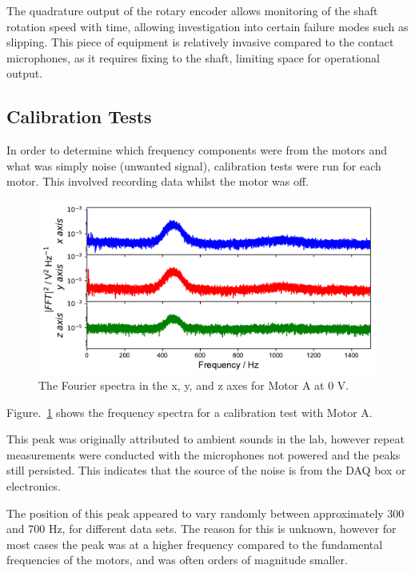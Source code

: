 The quadrature output of the rotary encoder allows monitoring of the shaft rotation speed with time, allowing investigation into certain failure modes such as slipping. This piece of equipment is relatively invasive compared to the contact microphones, as it requires fixing to the shaft, limiting space for operational output. 

\subsection{Calibration Tests}

In order to determine which frequency components were from the motors and what was simply noise (unwanted signal), calibration tests were run for each motor. This involved recording data whilst the motor was off. 

\begin{figure}[t]
    \includegraphics[width=1.0\textwidth]{fig/freq_large_0V.pdf}
    \caption[Calibration Frequency 1]{The Fourier spectra in the x, y, and z axes for Motor A at 0 V.}
    \label{fig:freq_large0V}
\end{figure}

Figure.~\ref{fig:freq_large0V} shows the frequency spectra for a calibration test with Motor A. 

This peak was originally attributed to ambient sounds in the lab, however repeat measurements were conducted with the microphones not powered and the peaks still persisted. This indicates that the source of the noise is from the DAQ box or electronics. 

The position of this peak appeared to vary randomly between approximately 300 and 700 Hz, for different data sets. The reason for this is unknown, however for most cases the peak was at a higher frequency compared to the fundamental frequencies of the motors, and was often orders of magnitude smaller. 

